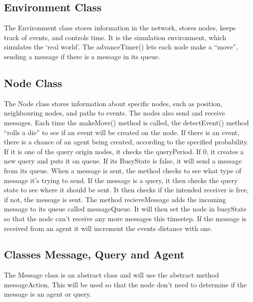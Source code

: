 \documentclass[a4paper,11pt,twoside]{article}
\begin{document}
\subsection{Environment Class}
The Environment class stores information in the network, stores nodes,
keeps track of events, and controls time. It is the simulation
environment, which simulates the ‘real world’. The advanceTimer() lets
each node make a “move”, sending a message if there is a message in
its queue.

\subsection{Node Class}
The Node class stores information about specific nodes, such as
position, neighbouring nodes, and paths to events. The nodes also send
and receive messages. Each time the makeMove() method is called, the
detectEvent() method “rolls a die” to see if an event will be created
on the node. If there is an event, there is a chance of an agent being
created, according to the specified probability. If it is one of the
query origin nodes, it checks the queryPeriod. If 0, it creates a new
query and puts it on queue. If its BusyState is false, it will send a
message from its queue. When a message is sent, the method checks to
see what type of message it’s trying to send. If the message is a
query, it then checks the query state to see where it should be
sent. It then checks if the intended receiver is free, if not, the
message is sent. The method recieveMessage adds the incoming message
to its queue called messageQueue. It will then set the node in
busyState so that the node can’t receive any more messages this
timestep. If the message is received from an agent it will increment
the events distance with one.


\subsection{Classes Message, Query and Agent}
The Message class is an abstract class and will use the abstract
method messageAction. This will be used so that the node don’t need to
determine if the message is an agent or query.
\end{document}
